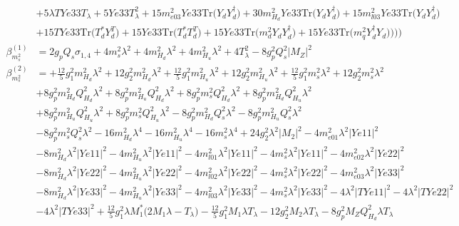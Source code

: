 \begin{align}
 &+5 \lambda TYe33 T_{\lambda} +5 Ye33 T_{\lambda}^{2} +15 m^2_{e03} Ye33 \mbox{Tr}\Big({Y_d  Y_{d}^{\dagger}}\Big) +30 m_{H_d}^2 Ye33 \mbox{Tr}\Big({Y_d  Y_{d}^{\dagger}}\Big) +15 m^2_{l03} Ye33 \mbox{Tr}\Big({Y_d  Y_{d}^{\dagger}}\Big) \nonumber \\ 
 &+15 TYe33 \mbox{Tr}\Big({T_d^*  Y_{d}^{T}}\Big) +15 Ye33 \mbox{Tr}\Big({T_d^*  T_{d}^{T}}\Big) +15 Ye33 \mbox{Tr}\Big({m_d^2  Y_d  Y_{d}^{\dagger}}\Big) +15 Ye33 \mbox{Tr}\Big({m_q^2  Y_{d}^{\dagger}  Y_d}\Big) \Big)\Big)\Big)\\ 
\beta_{m^2_{s}}^{(1)} & =  
2 g_p Q_s \sigma_{1,4}  + 4 m^2_{s} \lambda^{2}  + 4 m_{H_d}^2 \lambda^{2}  + 4 m_{H_u}^2 \lambda^{2}  + 4 T_{\lambda}^{2}  -8 g_{p}^{2} Q_{s}^{2} |M_Z|^2 \\ 
\beta_{m^2_{s}}^{(2)} & =  
+\frac{12}{5} g_{1}^{2} m_{H_d}^2 \lambda^{2} +12 g_{2}^{2} m_{H_d}^2 \lambda^{2} +\frac{12}{5} g_{1}^{2} m_{H_u}^2 \lambda^{2} +12 g_{2}^{2} m_{H_u}^2 \lambda^{2} +\frac{12}{5} g_{1}^{2} m^2_{s} \lambda^{2} +12 g_{2}^{2} m^2_{s} \lambda^{2} \nonumber \\ 
 &+8 g_{p}^{2} m_{H_d}^2 Q_{H_d}^{2} \lambda^{2} +8 g_{p}^{2} m_{H_u}^2 Q_{H_d}^{2} \lambda^{2} +8 g_{p}^{2} m^2_{s} Q_{H_d}^{2} \lambda^{2} +8 g_{p}^{2} m_{H_d}^2 Q_{H_u}^{2} \lambda^{2} \nonumber \\ 
 &+8 g_{p}^{2} m_{H_u}^2 Q_{H_u}^{2} \lambda^{2} +8 g_{p}^{2} m^2_{s} Q_{H_u}^{2} \lambda^{2} -8 g_{p}^{2} m_{H_d}^2 Q_{s}^{2} \lambda^{2} -8 g_{p}^{2} m_{H_u}^2 Q_{s}^{2} \lambda^{2} \nonumber \\ 
 &-8 g_{p}^{2} m^2_{s} Q_{s}^{2} \lambda^{2} -16 m_{H_d}^2 \lambda^{4} -16 m_{H_u}^2 \lambda^{4} -16 m^2_{s} \lambda^{4} +24 g_{2}^{2} \lambda^{2} |M_2|^2 -4 m^2_{e01} \lambda^{2} |Ye11|^2 \nonumber \\ 
 &-8 m_{H_d}^2 \lambda^{2} |Ye11|^2 -4 m_{H_u}^2 \lambda^{2} |Ye11|^2 -4 m^2_{l01} \lambda^{2} |Ye11|^2 -4 m^2_{s} \lambda^{2} |Ye11|^2 -4 m^2_{e02} \lambda^{2} |Ye22|^2 \nonumber \\ 
 &-8 m_{H_d}^2 \lambda^{2} |Ye22|^2 -4 m_{H_u}^2 \lambda^{2} |Ye22|^2 -4 m^2_{l02} \lambda^{2} |Ye22|^2 -4 m^2_{s} \lambda^{2} |Ye22|^2 -4 m^2_{e03} \lambda^{2} |Ye33|^2 \nonumber \\ 
 &-8 m_{H_d}^2 \lambda^{2} |Ye33|^2 -4 m_{H_u}^2 \lambda^{2} |Ye33|^2 -4 m^2_{l03} \lambda^{2} |Ye33|^2 -4 m^2_{s} \lambda^{2} |Ye33|^2 -4 \lambda^{2} |TYe11|^2 -4 \lambda^{2} |TYe22|^2 \nonumber \\ 
 &-4 \lambda^{2} |TYe33|^2 +\frac{12}{5} g_{1}^{2} \lambda M_1^* \Big(2 M_1 \lambda  - T_{\lambda} \Big)-\frac{12}{5} g_{1}^{2} M_1 \lambda T_{\lambda} -12 g_{2}^{2} M_2 \lambda T_{\lambda} -8 g_{p}^{2} M_Z Q_{H_d}^{2} \lambda T_{\lambda} \nonumber \\ 

\end{align}
